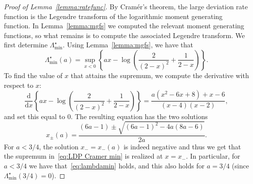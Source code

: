 \documentclass[11pt]{article}
\numberwithin{equation}{section}
\newcommand{\be}{\begin{equation}}
\newcommand{\ee}{\end{equation}}
\newcommand{\dd}{\mathrm d}
\theoremstyle{definition}
\begin{document}
\begin{proof}[Proof of Lemma~\ref{lemma:ratefunc}] 
By Cram\'er's theorem, the large deviation rate function is the Legendre transform of the logarithmic moment generating function. In Lemma~\ref{lemma:mgfs} we computed the relevant moment generating functions, so what remains is to compute the associated Legendre transform. 
We first determine $\Lambda^{\star}_{\min}$. Using Lemma~\ref{lemma:mgfs}, we have that 
\begin{equation}\label{eq:LDP Cramer min}
    \Lambda^\star_{\min}(a) = \sup_{x < 0} \left\{  ax - \log \left( \frac{2}{(2-x)^2} + \frac{1}{2-x} \right) \right\}. 
\end{equation}
To find the value of $x$ that attains the supremum, we compute the derivative with respect to $x$:
\begin{equation}
    \frac{\dd}{\dd x} \left\{ax - \log \left( \frac{2}{(2-x)^2} + \frac{1}{2-x} \right) \right\} =
    \frac{a(x^2-6x+8)+x-6}{(x-4)(x-2)},  
\end{equation}
and set this equal to $0$. 
The resulting equation has the two solutions
\be \label{eq:xmin}
    x_{\pm}(a) = \frac{(6a-1)\pm \sqrt{ (6a-1)^2 - 4a(8a-6) }}{2a} .
\ee
For $a< 3/4$, the solution $x_{-} = x_{-}(a)$ is indeed negative and thus we get that the supremum in~\eqref{eq:LDP Cramer min} is realized at $x=x_{-}$. 
In particular, 
for $a<3/4$ we have that~\eqref{eq:lambdamin} holds, 
and this also holds for $a=3/4$ 
(since 
$\Lambda^{\star}_{\min}(3/4) = 0$).


\end{proof}
\end{document}
